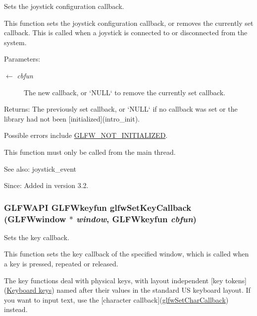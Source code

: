 Sets the joystick configuration callback. 

This function sets the joystick configuration callback, or removes the currently set callback. This is called when a joystick is connected to or disconnected from the system.

\begin{Desc}
\item[Parameters:]
\begin{description}
\item[\mbox{$\leftarrow$} {\em cbfun}]The new callback, or `NULL` to remove the currently set callback. \end{description}
\end{Desc}
\begin{Desc}
\item[Returns:]The previously set callback, or `NULL` if no callback was set or the library had not been \mbox{[}initialized\mbox{]}(intro\_\-init).\end{Desc}
Possible errors include \hyperlink{group__errors_g2374ee02c177f12e1fa76ff3ed15e14a}{GLFW\_\-NOT\_\-INITIALIZED}.

This function must only be called from the main thread.

\begin{Desc}
\item[See also:]joystick\_\-event\end{Desc}
\begin{Desc}
\item[Since:]Added in version 3.2. \end{Desc}
\hypertarget{group__input_ga73bb92f628a2a0be9c132d56f19362c}{
\subsubsection[glfwSetKeyCallback]{\setlength{\rightskip}{0pt plus 5cm}GLFWAPI {\bf GLFWkeyfun} glfwSetKeyCallback ({\bf GLFWwindow} $\ast$ {\em window}, \/  {\bf GLFWkeyfun} {\em cbfun})}}
\label{group__input_ga73bb92f628a2a0be9c132d56f19362c}


Sets the key callback. 

This function sets the key callback of the specified window, which is called when a key is pressed, repeated or released.

The key functions deal with physical keys, with layout independent \mbox{[}key tokens\mbox{]}(\hyperlink{group__keys}{Keyboard keys}) named after their values in the standard US keyboard layout. If you want to input text, use the \mbox{[}character callback\mbox{]}(\hyperlink{group__input_g07b2959b23dc3e466ce7475746021002}{glfwSetCharCallback}) instead.

